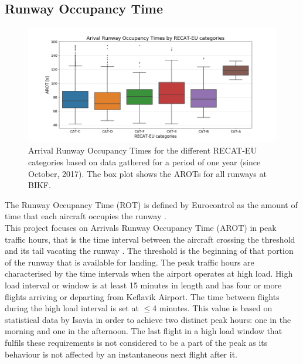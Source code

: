 \subsection{Runway Occupancy Time}


\begin{figure}
    \centering
    \includegraphics[width=1\textwidth]{graphics/fig_RECAT_AROTs_boxplot.png}
    \caption[AROTs boxplot for RECAT categories, all runways]{Arrival Runway Occupancy Times for the different RECAT-EU categories based on data gathered for a period of one year (since October, 2017). The box plot shows the AROTs for all runways at BIKF.}
    \label{fig:RECAT_AROTs_boxplot}
\end{figure}

The Runway Occupancy Time (ROT) is defined by Eurocontrol as the amount of time that each aircraft occupies the runway \cite{ROT_definition}. \\
This project focuses on Arrivals Runway Occupancy Time (AROT) in peak traffic hours, that is the time interval between the aircraft crossing the threshold and its tail vacating the runway \cite{AROT_definition}. The threshold is the beginning of that portion of the runway that is available for landing.
The peak traffic hours are characterised by the time intervals when the airport operates at high load. High load interval or window is at least 15 minutes in length and has four or more flights arriving or departing from Keflavik Airport. The time between flights during the high load interval is set at $\leq$4 minutes. This value is based on statistical data by Isavia in order to achieve two distinct peak hours: one in the morning and one in the afternoon. The last flight in a high load window that fulfils these requirements is not considered to be a part of the peak as its behaviour is not affected by an instantaneous next flight after it.   

